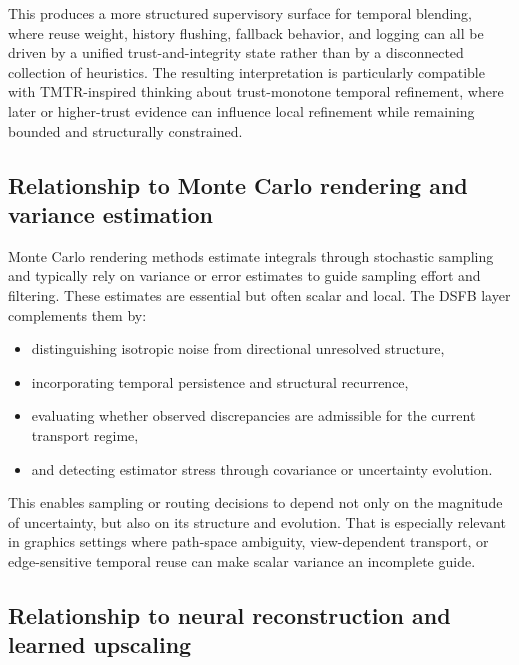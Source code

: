 \documentclass[11pt,letterpaper]{article}
\theoremstyle{gcresult}
\theoremstyle{definition}
\begin{document}
This produces a more structured supervisory surface for temporal blending, where reuse weight, history flushing, fallback behavior, and logging can all be driven by a unified trust-and-integrity state rather than by a disconnected collection of heuristics. The resulting interpretation is particularly compatible with TMTR-inspired thinking about trust-monotone temporal refinement, where later or higher-trust evidence can influence local refinement while remaining bounded and structurally constrained. 


\subsection{Relationship to Monte Carlo rendering and variance estimation}

Monte Carlo rendering methods estimate integrals through stochastic sampling and typically rely on variance or error estimates to guide sampling effort and filtering. These estimates are essential but often scalar and local. The DSFB layer complements them by:
\begin{itemize}[leftmargin=1.5em]
    \item distinguishing isotropic noise from directional unresolved structure,
    \item incorporating temporal persistence and structural recurrence,
    \item evaluating whether observed discrepancies are admissible for the current transport regime,
    \item and detecting estimator stress through covariance or uncertainty evolution.
\end{itemize}

This enables sampling or routing decisions to depend not only on the magnitude of uncertainty, but also on its structure and evolution. That is especially relevant in graphics settings where path-space ambiguity, view-dependent transport, or edge-sensitive temporal reuse can make scalar variance an incomplete guide. 


\subsection{Relationship to neural reconstruction and learned upscaling}
\end{document}

